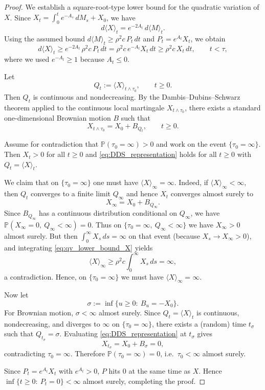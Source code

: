 \documentclass[pdflatex,sn-mathphys-ay]{sn-jnl}
\theoremstyle{thmstyleone}
\theoremstyle{definition}
\theoremstyle{remark}
\begin{document}
\begin{appendices}
\begin{proof}
We establish a square-root-type lower bound for the quadratic variation of $X$.
Since $X_t=\int_0^t e^{-A_s}\,dM_s + X_0$, we have
\[
d\langle X\rangle_t = e^{-2A_t}\,d\langle M\rangle_t.
\]
Using the assumed bound $d\langle M\rangle_t\ge \rho^2 c\,P_t\,dt$ and $P_t=e^{A_t}X_t$, we obtain
\begin{equation}\label{eq:qv_lower_bound_X}
d\langle X\rangle_t
\ge e^{-2A_t}\,\rho^2 c\,P_t\,dt
= \rho^2 c\,e^{-A_t}X_t\,dt
\ge \rho^2 c\,X_t\,dt,
\qquad t<\tau,
\end{equation}
where we used $e^{-A_t}\ge 1$ because $A_t\le 0$.

Let
\[
Q_t:=\langle X\rangle_{t\wedge\tau_0},\qquad t\ge0.
\]
Then $Q_t$ is continuous and nondecreasing.
By the Dambis--Dubins--Schwarz theorem applied to the continuous local martingale $X_{t\wedge\tau_0}$,
there exists a standard one-dimensional Brownian motion $B$ such that
\begin{equation}\label{eq:DDS_representation}
X_{t\wedge\tau_0} = X_0 + B_{Q_t},\qquad t\ge0.
\end{equation}

Assume for contradiction that $\mathbb P(\tau_0=\infty)>0$ and work on the event $\{\tau_0=\infty\}$.
Then $X_t>0$ for all $t\ge0$ and \eqref{eq:DDS_representation} holds for all $t\ge0$ with $Q_t=\langle X\rangle_t$.

We claim that on $\{\tau_0=\infty\}$ one must have $\langle X\rangle_\infty=\infty$.
Indeed, if $\langle X\rangle_\infty<\infty$, then $Q_t$ converges to a finite limit $Q_\infty$ and hence
$X_t$ converges almost surely to
\[
X_\infty = X_0 + B_{Q_\infty}.
\]
Since $B_{Q_\infty}$ has a continuous distribution conditional on $Q_\infty$, we have
$\mathbb P(X_\infty=0,\ Q_\infty<\infty)=0$.
Thus on $\{\tau_0=\infty,\ Q_\infty<\infty\}$ we have $X_\infty>0$ almost surely.
But then $\int_0^\infty X_s\,ds=\infty$ on that event (because $X_s\to X_\infty>0$), and integrating
\eqref{eq:qv_lower_bound_X} yields
\[
\langle X\rangle_\infty
\ge \rho^2 c\int_0^\infty X_s\,ds
= \infty,
\]
a contradiction. Hence, on $\{\tau_0=\infty\}$ we must have $\langle X\rangle_\infty=\infty$.

Now let
\[
\sigma:=\inf\{u\ge0:\ B_u=-X_0\}.
\]
For Brownian motion, $\sigma<\infty$ almost surely.
Since $Q_t=\langle X\rangle_t$ is continuous, nondecreasing, and diverges to $\infty$ on $\{\tau_0=\infty\}$, there
exists a (random) time $t_\sigma$ such that $Q_{t_\sigma}=\sigma$.
Evaluating \eqref{eq:DDS_representation} at $t_\sigma$ gives
\[
X_{t_\sigma}=X_0+B_{\sigma}=0,
\]
contradicting $\tau_0=\infty$.
Therefore $\mathbb P(\tau_0=\infty)=0$, i.e.\ $\tau_0<\infty$ almost surely.

Since $P_t=e^{A_t}X_t$ with $e^{A_t}>0$, $P$ hits $0$ at the same time as $X$.
Hence $\inf\{t\ge0:\ P_t=0\}<\infty$ almost surely, completing the proof.
\end{proof}


\end{appendices}
\end{document}
